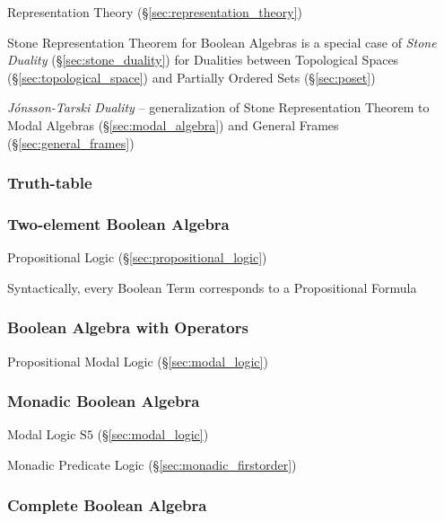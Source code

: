 \fist Representation Theory (\S\ref{sec:representation_theory})

\fist Stone Representation Theorem for Boolean Algebras is a special case of
\emph{Stone Duality} (\S\ref{sec:stone_duality}) for Dualities between
Topological Spaces (\S\ref{sec:topological_space}) and Partially Ordered Sets
(\S\ref{sec:poset})

\fist \emph{J\'onsson-Tarski Duality} --
generalization of Stone Representation Theorem to Modal Algebras
(\S\ref{sec:modal_algebra}) and General Frames (\S\ref{sec:general_frames})



\subsubsection{Truth-table}\label{sec:truth_table}

\subsubsection{Two-element Boolean Algebra}\label{sec:twoelement_boolean}

Propositional Logic (\S\ref{sec:propositional_logic})

Syntactically, every Boolean Term corresponds to a Propositional
Formula



\subsubsection{Boolean Algebra with Operators}\label{sec:boolean_with_operators}

Propositional Modal Logic (\S\ref{sec:modal_logic})



\subsubsection{Monadic Boolean Algebra}\label{sec:monadic_boolean}

Modal Logic $\mathrm{S5}$ (\S\ref{sec:modal_logic})

Monadic Predicate Logic (\S\ref{sec:monadic_firstorder})



\subsubsection{Complete Boolean Algebra}\label{sec:complete_boolean}

